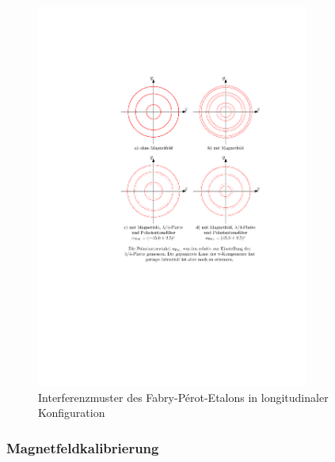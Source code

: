 \documentclass[11pt, a4paper]{article}
\begin{document}
\begin{figure}[h]
	\centering
	\includegraphics[width=0.8\textwidth]{./figures/zeeman_longitudinal.pdf}
	\caption{Interferenzmuster des Fabry-Pérot-Etalons in longitudinaler Konfiguration}
	\label{fig:zeeman_longitudinal}
\end{figure}

\subsubsection{Magnetfeldkalibrierung}


\FloatBarrier
\end{document}

